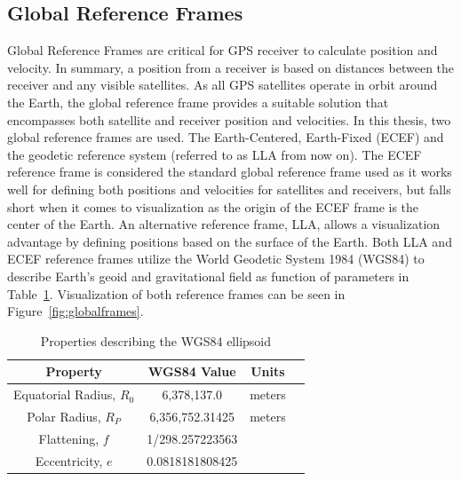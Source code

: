 \documentclass[12pt]{report}
\begin{document}
\subsection{Global Reference Frames}
Global Reference Frames are critical for GPS receiver to calculate position and velocity. In summary, a position from a receiver is based on distances between the receiver and any visible satellites. As all GPS satellites operate in orbit around the Earth, the global reference frame provides a suitable solution that encompasses both satellite and receiver position and velocities. In this thesis, two global reference frames are used. The Earth-Centered, Earth-Fixed (ECEF) and the geodetic reference system (referred to as LLA from now on). The ECEF reference frame is considered the standard global reference frame used as it works well for defining both positions and velocities for satellites and receivers, but falls short when it comes to visualization as the origin of the ECEF frame is the center of the Earth. An alternative reference frame, LLA, allows a visualization advantage by defining positions based on the surface of the Earth. Both LLA and ECEF reference frames utilize the World Geodetic System 1984 (WGS84) to describe Earth's geoid and gravitational field as function of parameters in Table~\ref{tbl:wgs84}. Visualization of both reference frames can be seen in Figure~\ref{fig:globalframes}.

\begin{table}[!ht]\label{tbl:wgs84}
  \caption{Properties describing the WGS84 ellipsoid}
  \centering
  \begin{tabular}{cccc}
    \toprule
    \textbf{Property}          & \textbf{WGS84 Value} & \textbf{Units} \\
    \midrule
    Equatorial Radius, \(R_0\) & 6,378,137.0          & meters         \\
    Polar Radius, \(R_P\)      & 6,356,752.31425      & meters         \\
    Flattening, \(f\)          & 1/298.257223563      &                \\
    Eccentricity, \(e\)        & 0.0818181808425      &                \\
    \bottomrule
  \end{tabular}
\end{table}
\end{document}
